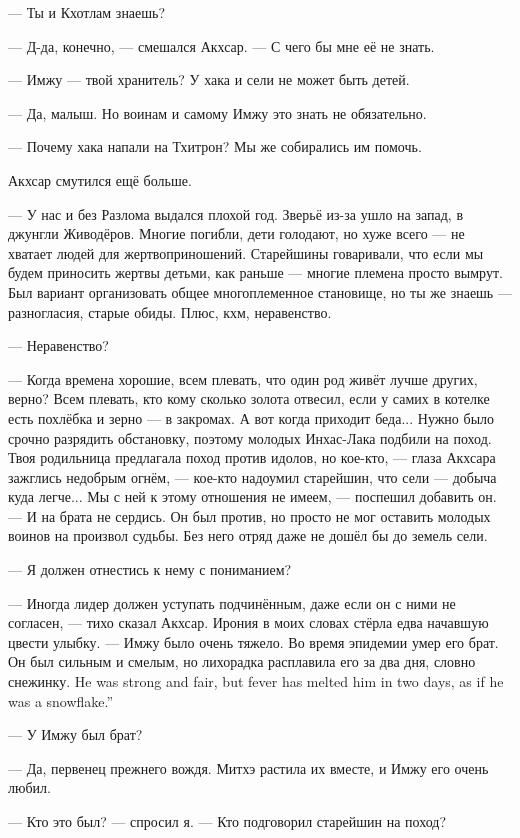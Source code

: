 --- Ты и Кхотлам знаешь?

--- Д-да, конечно, --- смешался Акхсар.
--- С чего бы мне её не знать.

--- Имжу --- твой хранитель?
У хака и сели не может быть детей.

--- Да, малыш.
Но воинам и самому Имжу это знать не обязательно.

--- Почему хака напали на Тхитрон?
Мы же собирались им помочь.

Акхсар смутился ещё больше.

--- У нас и без Разлома выдался плохой год.
Зверьё из-за ушло на запад, в джунгли Живодёров.
Многие погибли, дети голодают, но хуже всего --- не хватает людей для жертвоприношений.
Старейшины говаривали, что если мы будем приносить жертвы детьми, как раньше --- многие племена просто вымрут.
Был вариант организовать общее многоплеменное становище, но ты же знаешь --- разногласия, старые обиды.
Плюс, кхм, неравенство.

--- Неравенство?

--- Когда времена хорошие, всем плевать, что один род живёт лучше других, верно?
Всем плевать, кто кому сколько золота отвесил, если у самих в котелке есть похлёбка и зерно --- в закромах.
А вот когда приходит беда...
Нужно было срочно разрядить обстановку, поэтому молодых Инхас-Лака подбили на поход.
Твоя родильница предлагала поход против идолов, но кое-кто, --- глаза Акхсара зажглись недобрым огнём, --- кое-кто надоумил старейшин, что сели --- добыча куда легче...
Мы с ней к этому отношения не имеем, --- поспешил добавить он.
--- И на брата не сердись.
Он был против, но просто не мог оставить молодых воинов на произвол судьбы.
Без него отряд даже не дошёл бы до земель сели.

--- Я должен отнестись к нему с пониманием?

--- Иногда лидер должен уступать подчинённым, даже если он с ними не согласен, --- тихо сказал Акхсар.
Ирония в моих словах стёрла едва начавшую цвести улыбку.
--- Имжу было очень тяжело.
Во время эпидемии умер его брат.
{Он был сильным и смелым, но лихорадка расплавила его за два дня, словно снежинку.}
{He was strong and fair, but fever has melted him in two days, as if he was a snowflake.''}

--- У Имжу был брат?

--- Да, первенец прежнего вождя.
Митхэ растила их вместе, и Имжу его очень любил.

--- Кто это был? --- спросил я.
--- Кто подговорил старейшин на поход?

